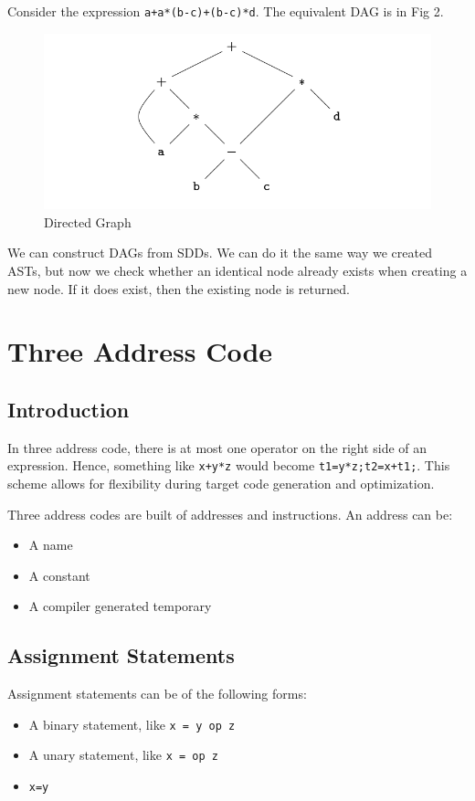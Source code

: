 \documentclass[12pt,letterpaper]{book}
\theoremstyle{definition}
\begin{document}
Consider the expression \texttt{a+a*(b-c)+(b-c)*d}. The equivalent DAG is in Fig 2.

\begin{figure}[htpb]
  \centering
  \includegraphics[width=0.8\linewidth]{./assets/DAG_eg.png}
  \caption{Directed Graph}%
  \label{fig:}
\end{figure}

We can construct DAGs from SDDs. We can do it the same way we created ASTs, but now we check whether an identical node already exists when creating a new node. If it does exist, then the existing node is returned.

\section{Three Address Code}

\subsection{Introduction}

In three address code, there is at most one operator on the right side of an expression. Hence, something like \texttt{x+y*z} would become \texttt{t1=y*z;t2=x+t1;}. This scheme allows for flexibility during target code generation and optimization.

Three address codes are built of addresses and instructions. An address can be:
\begin{itemize}
  \item A name
  \item A constant
  \item A compiler generated temporary
\end{itemize}

\subsection{Assignment Statements}

Assignment statements can be of the following forms:
\begin{itemize}
  \item A binary statement, like \texttt{x = y op z}
  \item A unary statement, like \texttt{x = op z}
  \item \texttt{x=y}
\end{itemize}
\end{document}
